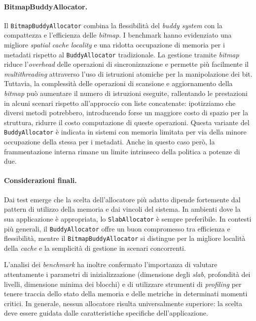\paragraph{BitmapBuddyAllocator.}
Il \texttt{BitmapBuddyAllocator} combina la flessibilità del \textit{buddy system} con la compattezza e l’efficienza delle \textit{bitmap}. I benchmark hanno evidenziato una migliore \textit{spatial cache locality} e una ridotta occupazione di memoria per i metadati rispetto al \texttt{BuddyAllocator} tradizionale. La gestione tramite \textit{bitmap} riduce l’\textit{overhead} delle operazioni di sincronizzazione e permette più facilmente il \textit{multithreading} attraverso l'uso di istruzioni atomiche per la manipolazione dei bit. Tuttavia, la complessità delle operazioni di scansione e aggiornamento della \textit{bitmap} può aumentare il numero di istruzioni eseguite, rallentando le prestazioni in alcuni scenari rispetto all’approccio con liste concatenate: ipotizziamo che diversi metodi potrebbero, introducendo forse un maggiore costo di spazio per la struttura, ridurre il costo computazione di queste operazioni.
Questa variante del \texttt{BuddyAllocator} è indicata in sistemi con memoria limitata per via della minore occupazione della stessa per i metadati. Anche in questo caso però, la frammentazione interna rimane un limite intrinseco della politica a potenze di due.

\paragraph{Considerazioni finali.}
Dai test emerge che la scelta dell’allocatore più adatto dipende fortemente dal pattern di utilizzo della memoria e dai vincoli del sistema. In ambienti dove la sua applicazione è appropriata, lo \texttt{SlabAllocator} è sempre preferibile. In contesti più generali, il \texttt{BuddyAllocator} offre un buon compromesso tra efficienza e flessibilità, mentre il \texttt{BitmapBuddyAllocator} si distingue per la migliore località della \textit{cache} e la semplicità di gestione in scenari concorrenti.

L’analisi dei \textit{benchmark} ha inoltre confermato l’importanza di valutare attentamente i parametri di inizializzazione (dimensione degli \textit{slab}, profondità dei livelli, dimensione minima dei blocchi) e di utilizzare strumenti di \textit{profiling} per tenere traccia dello stato della memoria e delle metriche in determinati momenti critici. In generale, nessun allocatore risulta universalmente superiore: la scelta deve essere guidata dalle caratteristiche specifiche dell’applicazione.


